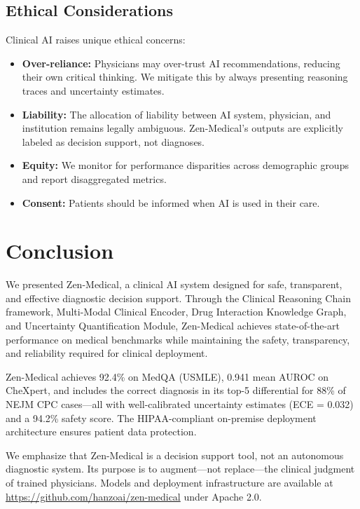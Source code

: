 \documentclass[11pt,a4paper]{article}
\begin{document}
\subsection{Ethical Considerations}

Clinical AI raises unique ethical concerns:
\begin{itemize}
    \item \textbf{Over-reliance:} Physicians may over-trust AI recommendations, reducing their own critical thinking. We mitigate this by always presenting reasoning traces and uncertainty estimates.
    \item \textbf{Liability:} The allocation of liability between AI system, physician, and institution remains legally ambiguous. Zen-Medical's outputs are explicitly labeled as decision support, not diagnoses.
    \item \textbf{Equity:} We monitor for performance disparities across demographic groups and report disaggregated metrics.
    \item \textbf{Consent:} Patients should be informed when AI is used in their care.
\end{itemize}

\section{Conclusion}
\label{sec:conclusion}

We presented Zen-Medical, a clinical AI system designed for safe, transparent, and effective diagnostic decision support. Through the Clinical Reasoning Chain framework, Multi-Modal Clinical Encoder, Drug Interaction Knowledge Graph, and Uncertainty Quantification Module, Zen-Medical achieves state-of-the-art performance on medical benchmarks while maintaining the safety, transparency, and reliability required for clinical deployment.

Zen-Medical achieves 92.4\% on MedQA (USMLE), 0.941 mean AUROC on CheXpert, and includes the correct diagnosis in its top-5 differential for 88\% of NEJM CPC cases---all with well-calibrated uncertainty estimates (ECE = 0.032) and a 94.2\% safety score. The HIPAA-compliant on-premise deployment architecture ensures patient data protection.

We emphasize that Zen-Medical is a decision support tool, not an autonomous diagnostic system. Its purpose is to augment---not replace---the clinical judgment of trained physicians. Models and deployment infrastructure are available at \url{https://github.com/hanzoai/zen-medical} under Apache 2.0.
\end{document}
